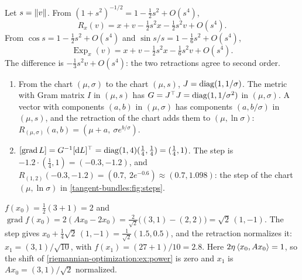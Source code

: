Let $s = \left\|v\right\|$. From $(1 + s^2)^{-1/2} = 1 - \frac12s^2 + O(s^4)$,
\[
  R_x(v) = x + v - \tfrac12s^2x - \tfrac12s^2v + O(s^4) .
\]
From $\cos s = 1 - \frac12s^2 + O(s^4)$ and
$\sin s/s = 1 - \frac16s^2 + O(s^4)$,
\[
  \operatorname{Exp}_x(v) = x + v - \tfrac12s^2x - \tfrac16s^2v + O(s^4) .
\]
The difference is $-\frac13s^2v + O(s^4)$: the two retractions agree to
second order.

\begin{enumerate}[nosep]
  \item From the chart $(\mu, \sigma)$ to the chart $(\mu, s)$,
        $J = \operatorname{diag}(1, 1/\sigma)$. The metric with Gram matrix $I$ in
        $(\mu, s)$ has $G = J^\top J = \operatorname{diag}(1, 1/\sigma^2)$ in
        $(\mu, \sigma)$. A vector with components $(a, b)$ in
        $(\mu, \sigma)$ has components $(a, b/\sigma)$ in $(\mu, s)$,
        and the retraction of the chart adds them to $(\mu, \ln\sigma)$:
        $R_{(\mu, \sigma)}(a, b) = (\mu + a,\ \sigma e^{b/\sigma})$.
  \item $[\operatorname{grad}L] = G^{-1}[\mathrm{d} L]^\top
        = \operatorname{diag}(1, 4)(\frac14, \frac14) = (\frac14, 1)$. The step is
        $-1.2\cdot(\frac14, 1) = (-0.3, -1.2)$, and
        $R_{(1, 2)}(-0.3, -1.2) = (0.7,\ 2e^{-0.6})\approx(0.7, 1.098)$:
        the step of the chart $(\mu, \ln\sigma)$ in
        \cref{tangent-bundles:fig:steps}.
\end{enumerate}

$f(x_0) = \frac12(3 + 1) = 2$ and
$\operatorname{grad}f(x_0) = 2(Ax_0 - 2x_0)
= \frac2{\sqrt2}\bigl((3, 1) - (2, 2)\bigr) = \sqrt2\,(1, -1)$. The step
gives $x_0 + \frac14\sqrt2\,(1, -1) = \frac1{\sqrt2}(1.5, 0.5)$, and the
retraction normalizes it: $x_1 = (3, 1)/\sqrt{10}$, with
$f(x_1) = (27 + 1)/10 = 2.8$. Here $2\eta\left\langle x_0, Ax_0 \right\rangle = 1$, so the
shift of \cref{riemannian-optimization:ex:power} is zero and $x_1$ is
$Ax_0 = (3, 1)/\sqrt2$ normalized.

